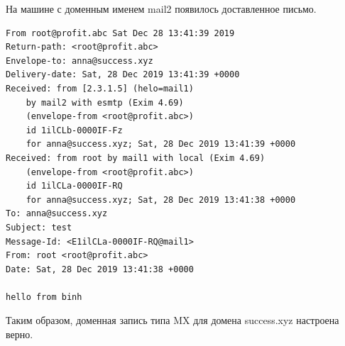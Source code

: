 \documentclass[a4paper,12pt]{article}
\begin{document}
На машине с доменным именем mail2 появилось доставленное письмо.
\begin{verbatim}
From root@profit.abc Sat Dec 28 13:41:39 2019
Return-path: <root@profit.abc>
Envelope-to: anna@success.xyz
Delivery-date: Sat, 28 Dec 2019 13:41:39 +0000
Received: from [2.3.1.5] (helo=mail1)
	by mail2 with esmtp (Exim 4.69)
	(envelope-from <root@profit.abc>)
	id 1ilCLb-0000IF-Fz
	for anna@success.xyz; Sat, 28 Dec 2019 13:41:39 +0000
Received: from root by mail1 with local (Exim 4.69)
	(envelope-from <root@profit.abc>)
	id 1ilCLa-0000IF-RQ
	for anna@success.xyz; Sat, 28 Dec 2019 13:41:38 +0000
To: anna@success.xyz
Subject: test
Message-Id: <E1ilCLa-0000IF-RQ@mail1>
From: root <root@profit.abc>
Date: Sat, 28 Dec 2019 13:41:38 +0000

hello from binh

\end{verbatim}

Таким образом, доменная запись типа MX для домена success.xyz настроена верно.
\end{document}
